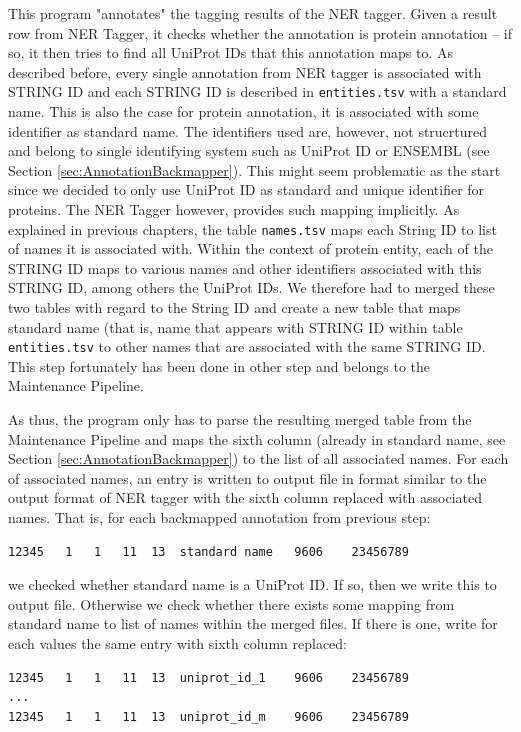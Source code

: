 This program "annotates" the tagging results of the NER tagger. Given a result row from NER Tagger, it checks whether the annotation is protein annotation -- if so, it then tries to find all UniProt IDs that this annotation maps to. As described before, every single annotation from NER tagger is associated with STRING ID and each STRING ID is described in \texttt{entities.tsv} with a standard name. This is also the case for protein annotation, it is associated with some identifier as standard name. The identifiers used are, however, not strucrtured and belong to single identifying system such as UniProt ID or ENSEMBL (see Section \ref{sec:AnnotationBackmapper}). This might seem problematic as the start since we decided to only use UniProt ID as standard and unique identifier for proteins. The NER Tagger however, provides such mapping implicitly. As explained in previous chapters, the table \texttt{names.tsv} maps each String ID to list of names it is associated with. Within the context of protein entity, each of the STRING ID maps to various names and other identifiers associated with this STRING ID, among others the UniProt IDs. We therefore had to merged these two tables with regard to the String ID and create a new table that maps standard name (that is, name that appears with STRING ID within table \texttt{entities.tsv} to other names that are associated with the same STRING ID. This step fortunately has been done in other step and belongs to the Maintenance Pipeline.

As thus, the program only has to parse the resulting merged table from the Maintenance Pipeline and maps the sixth column (already in standard name, see Section \ref{sec:AnnotationBackmapper}) to the list of all associated names. For each of associated names, an entry is written to output file in format similar to the output format of NER tagger with the sixth column replaced with associated names. That is, for each backmapped annotation from previous step:

\begin{lstlisting}[breaklines]
12345	1	1	11	13	standard name	9606	23456789
\end{lstlisting}

we checked whether standard name is a UniProt ID. If so, then we write this to output file. Otherwise we check whether there exists some mapping from standard name to list of names within the merged files. If there is one, write for each values the same entry with sixth column replaced:

\begin{lstlisting}[breaklines]
12345	1	1	11	13	uniprot_id_1	9606	23456789
...
12345	1	1	11	13	uniprot_id_m	9606	23456789
\end{lstlisting}


